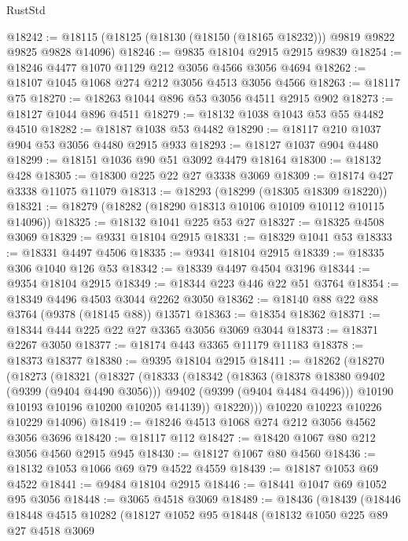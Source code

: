 \begin{lexlean}{RustStd}
\begin{coremodule}
@18242 := @18115 (@18125 (@18130 (@18150 (@18165 @18232))) @9819 @9822 @9825 @9828 @14096)
@18246 := @9835 @18104 @2915 @2915 @9839
@18254 := @18246 @4477 @1070 @1129 @212 @3056 @4566 @3056 @4694
@18262 := @18107 @1045 @1068 @274 @212 @3056 @4513 @3056 @4566
@18263 := @18117 @75
@18270 := @18263 @1044 @896 @53 @3056 @4511 @2915 @902
@18273 := @18127 @1044 @896 @4511
@18279 := @18132 @1038 @1043 @53 @55 @4482 @4510
@18282 := @18187 @1038 @53 @4482
@18290 := @18117 @210 @1037 @904 @53 @3056 @4480 @2915 @933
@18293 := @18127 @1037 @904 @4480
@18299 := @18151 @1036 @90 @51 @3092 @4479 @18164
@18300 := @18132 @428
@18305 := @18300 @225 @22 @27 @3338 @3069
@18309 := @18174 @427 @3338 @11075 @11079
@18313 := @18293 (@18299 (@18305 @18309 @18220))
@18321 := @18279 (@18282 (@18290 @18313 @10106 @10109 @10112 @10115 @14096))
@18325 := @18132 @1041 @225 @53 @27
@18327 := @18325 @4508 @3069
@18329 := @9331 @18104 @2915
@18331 := @18329 @1041 @53
@18333 := @18331 @4497 @4506
@18335 := @9341 @18104 @2915
@18339 := @18335 @306 @1040 @126 @53
@18342 := @18339 @4497 @4504 @3196
@18344 := @9354 @18104 @2915
@18349 := @18344 @223 @446 @22 @51 @3764
@18354 := @18349 @4496 @4503 @3044 @2262 @3050
@18362 := @18140 @88 @22 @88 @3764 (@9378 (@18145 @88)) @13571
@18363 := @18354 @18362
@18371 := @18344 @444 @225 @22 @27 @3365 @3056 @3069 @3044
@18373 := @18371 @2267 @3050
@18377 := @18174 @443 @3365 @11179 @11183
@18378 := @18373 @18377
@18380 := @9395 @18104 @2915
@18411 := @18262
    (@18270
      (@18273
        (@18321
          (@18327
            (@18333
              (@18342
                (@18363
                  (@18378 @18380 @9402 (@9399 (@9404 @4490 @3056)))
                  @9402
                  (@9399 (@9404 @4484 @4496)))
                @10190
                @10193
                @10196
                @10200
                @10205
                @14139))
            @18220)))
      @10220
      @10223
      @10226
      @10229
      @14096)
@18419 := @18246 @4513 @1068 @274 @212 @3056 @4562 @3056 @3696
@18420 := @18117 @112
@18427 := @18420 @1067 @80 @212 @3056 @4560 @2915 @945
@18430 := @18127 @1067 @80 @4560
@18436 := @18132 @1053 @1066 @69 @79 @4522 @4559
@18439 := @18187 @1053 @69 @4522
@18441 := @9484 @18104 @2915
@18446 := @18441 @1047 @69 @1052 @95 @3056
@18448 := @3065 @4518 @3069
@18489 := @18436
    (@18439
      (@18446
        @18448
        @4515
        @10282
        (@18127
          @1052
          @95
          @18448
          (@18132
            @1050
            @225
            @89
            @27
            @4518
            @3069

\end{coremodule}
\end{lexlean}
